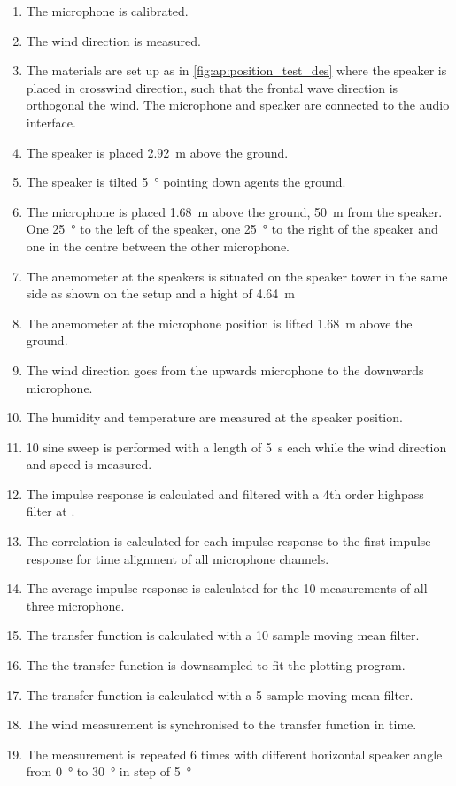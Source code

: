 \begin{enumerate}
\item The microphone is calibrated.
\item The wind direction is measured.
\item The materials are set up as in \autoref{fig:ap:position_test_des} where the speaker is placed in crosswind direction, such that the frontal wave direction is orthogonal the wind. The microphone and speaker are connected to the audio interface.
\item The speaker is placed \SI{2.92}{\meter} above the ground.
\item The speaker is tilted \SI{5}{\degree} pointing down agents the ground.
\item The microphone is placed \SI{1.68}{\meter} above the ground, \SI{50}{\meter} from the speaker. One \SI{25}{\degree} to the left of the speaker, one \SI{25}{\degree} to the right of the speaker and one in the centre between the other microphone.
\item The anemometer at the speakers is situated on the speaker tower in the same side as shown on the setup and a hight of \SI{4.64}{\meter}
\item The anemometer at the microphone position is lifted \SI{1.68}{\meter} above the ground.
\item The wind direction goes from the upwards microphone to the downwards microphone.
\item The humidity and temperature are measured at the speaker position.
\item 10 sine sweep is performed with a length of \SI{5}{\second} each while the wind direction and speed is measured.
\item The impulse response is calculated and filtered with a 4th order highpass filter at .
\item The correlation is calculated for each impulse response to the first impulse response for time alignment \citep{gunness2001loudspeaker} of all microphone channels.
\item The average impulse response is calculated for the 10 measurements of all three microphone.
\item The transfer function is calculated with a 10 sample moving mean filter.
\item The the transfer function is downsampled to fit the plotting program.
\item The transfer function is calculated with a 5 sample moving mean filter.
\item The wind measurement is synchronised to the transfer function in time. 
\item The measurement is repeated 6 times with different horizontal speaker angle from \SI{0}{\degree} to \SI{30}{\degree} in step of \SI{5}{\degree}
\end{enumerate}


